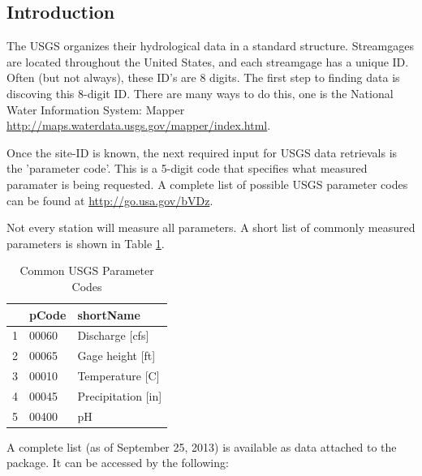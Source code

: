 \documentclass[a4paper,11pt]{article}\usepackage[]{graphicx}\usepackage[]{color}
\begin{document}
\subsection{Introduction}
The USGS organizes their hydrological data in a standard structure.  Streamgages are located throughout the United States, and each streamgage has a unique ID.  Often (but not always), these ID's are 8 digits.  The first step to finding data is discoving this 8-digit ID. There are many ways to do this, one is the National Water Information System: Mapper \url{http://maps.waterdata.usgs.gov/mapper/index.html}.

Once the site-ID is known, the next required input for USGS data retrievals is the 'parameter code'.  This is a 5-digit code that specifies what measured paramater is being requested.  A complete list of possible USGS parameter codes can be found at \url{http://go.usa.gov/bVDz}.

Not every station will measure all parameters. A short list of commonly measured parameters is shown in Table \ref{tab:params}.


\begin{table}[ht]
\centering
\begin{tabular}{rll}
  \hline
 & pCode & shortName \\ 
  \hline
1 & 00060 & Discharge [cfs] \\ 
  2 & 00065 & Gage height [ft] \\ 
  3 & 00010 & Temperature [C] \\ 
  4 & 00045 & Precipitation [in] \\ 
  5 & 00400 & pH \\ 
   \hline
\end{tabular}
\caption{Common USGS Parameter Codes} 
\label{tab:params}
\end{table}



A complete list (as of September 25, 2013) is available as data attached to the package. It can be accessed by the following:
\end{document}
